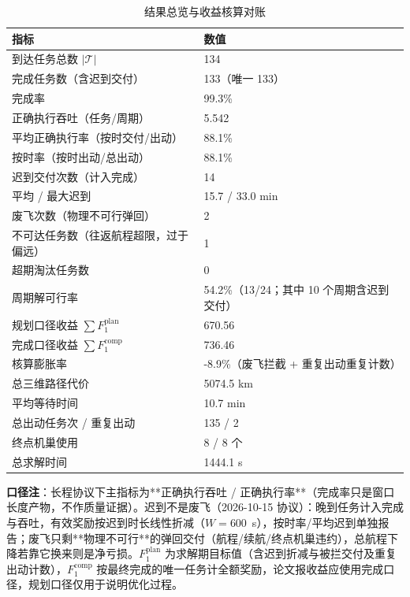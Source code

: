 \documentclass[a4paper,11pt]{article}
\begin{document}
\begin{table}[htbp]\centering
\caption{结果总览与收益核算对账}
\label{tab:exp01-outcome}
\begin{tabular}{ll}
\toprule
指标 & 数值 \\
\midrule
到达任务总数 $|\mathcal{T}|$ & 134 \\
完成任务数（含迟到交付） & 133（唯一 133） \\
完成率 & 99.3\% \\
正确执行吞吐（任务/周期） & 5.542 \\
平均正确执行率（按时交付/出动） & 88.1\% \\
按时率（按时出动/总出动） & 88.1\% \\
迟到交付次数（计入完成） & 14 \\
平均 / 最大迟到 & 15.7 / 33.0 min \\
废飞次数（物理不可行弹回） & 2 \\
不可达任务数（往返航程超限，过于偏远） & 1 \\
超期淘汰任务数 & 0 \\
周期解可行率 & 54.2\%（13/24；其中 10 个周期含迟到交付） \\
规划口径收益 $\sum F_1^{\mathrm{plan}}$ & 670.56 \\
完成口径收益 $\sum F_1^{\mathrm{comp}}$ & 736.46 \\
核算膨胀率 & -8.9\%（废飞拦截 + 重复出动重复计数） \\
总三维路径代价 & 5074.5 km \\
平均等待时间 & 10.7 min \\
总出动任务次 / 重复出动 & 135 / 2 \\
终点机巢使用 & 8 / 8 个 \\
总求解时间 & 1444.1 s \\
\bottomrule
\end{tabular}

\vspace{2pt}\parbox{0.92\linewidth}{\footnotesize \textbf{口径注}：长程协议下主指标为**正确执行吞吐 / 正确执行率**（完成率只是窗口长度产物，不作质量证据）。迟到不是废飞（2026-10-15 协议）：晚到任务计入完成与吞吐，有效奖励按迟到时长线性折减（$W=600$~s），按时率/平均迟到单独报告；废飞只剩**物理不可行**的弹回交付（航程/续航/终点机巢违约），总航程下降若靠它换来则是净亏损。$F_1^{\mathrm{plan}}$ 为求解期目标值（含迟到折减与被拦交付及重复出动计数），$F_1^{\mathrm{comp}}$ 按最终完成的唯一任务计全额奖励，论文报收益应使用完成口径，规划口径仅用于说明优化过程。}
\end{table}
\end{document}
